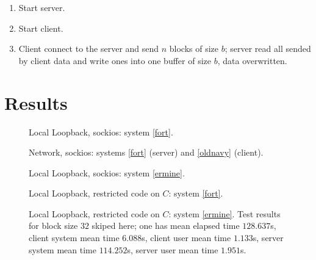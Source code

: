 \documentclass[a4paper]{article}
\begin{document}
\begin{enumerate}
  \item Start server.
  \item Start client.
  \item Client connect to the server and send $n$ blocks of size $b$;
        server read all sended by client data and write ones into one
        buffer of size $b$, data overwritten.
\end{enumerate}


\section{Results}

\begin{figure}
  \begin{center}
    
  \end{center}
  \caption{Local Loopback, sockios: system \ref{fort}.}
\end{figure}

\begin{figure}
  \begin{center}
    
  \end{center}
  \caption{Network, sockios:
           systems \ref{fort} (server) and \ref{oldnavy} (client).}
\end{figure}

\begin{figure}
  \begin{center}
    
  \end{center}
  \caption{Local Loopback, sockios: system \ref{ermine}.}
\end{figure}

\begin{figure}
  \begin{center}
    
  \end{center}
  \caption{Local Loopback, restricted code on $C$: system \ref{fort}.}
\end{figure}

\begin{figure}
  \begin{center}
    
  \end{center}
  \caption{Local Loopback, restricted code on $C$: system \ref{ermine}.
           Test results for block size $32$ skiped here; one has 
           mean elapsed time $128.637$s, client system mean 
           time $6.088$s, client user mean time $1.133$s, server system
           mean time $114.252$s, server user mean time $1.951$s.}
\end{figure}
\end{document}

